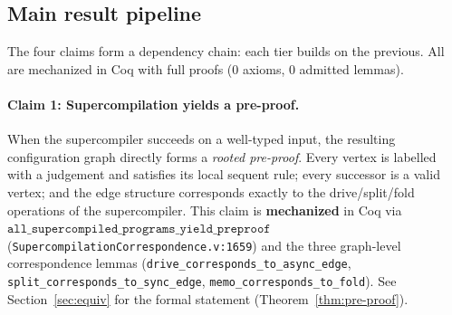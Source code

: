 \subsection{Main result pipeline}
\label{sec:thesis:pipeline}

\begin{center}
\end{center}

The four claims form a dependency chain: each tier builds on the previous. All are mechanized in Coq with full proofs (0 axioms, 0 admitted lemmas).

\paragraph{Claim 1: Supercompilation yields a pre-proof.}
When the supercompiler succeeds on a well-typed input, the resulting configuration graph directly forms a \emph{rooted pre-proof}.
Every vertex is labelled with a judgement and satisfies its local sequent rule; every successor is a valid vertex; and the edge structure corresponds exactly to the drive/split/fold operations of the supercompiler.
This claim is \textbf{mechanized} in Coq via $\texttt{all\_supercompiled\_programs\_yield\_preproof}$ (\texttt{SupercompilationCorrespondence.v:1659}) and the three graph-level correspondence lemmas (\texttt{drive\_corresponds\_to\_async\_edge}, \texttt{split\_corresponds\_to\_sync\_edge}, \texttt{memo\_corresponds\_to\_fold}).
See Section~\ref{sec:equiv} for the formal statement (Theorem~\ref{thm:pre-proof}).

